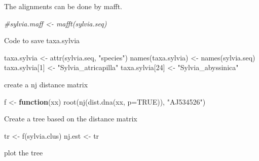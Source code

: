 \documentclass[
]{article}
\newenvironment{Shaded}{\begin{snugshade}}{\end{snugshade}}
\newcommand{\AttributeTok}[1]{\textcolor[rgb]{0.77,0.63,0.00}{#1}}
\newcommand{\CommentTok}[1]{\textcolor[rgb]{0.56,0.35,0.01}{\textit{#1}}}
\newcommand{\ConstantTok}[1]{\textcolor[rgb]{0.00,0.00,0.00}{#1}}
\newcommand{\ControlFlowTok}[1]{\textcolor[rgb]{0.13,0.29,0.53}{\textbf{#1}}}
\newcommand{\DecValTok}[1]{\textcolor[rgb]{0.00,0.00,0.81}{#1}}
\newcommand{\FunctionTok}[1]{\textcolor[rgb]{0.00,0.00,0.00}{#1}}
\newcommand{\NormalTok}[1]{#1}
\newcommand{\OtherTok}[1]{\textcolor[rgb]{0.56,0.35,0.01}{#1}}
\newcommand{\SpecialCharTok}[1]{\textcolor[rgb]{0.00,0.00,0.00}{#1}}
\newcommand{\StringTok}[1]{\textcolor[rgb]{0.31,0.60,0.02}{#1}}
\begin{document}
The alignments can be done by mafft.

\begin{Shaded}
\begin{Highlighting}[]
\CommentTok{\#sylvia.maff \textless{}{-} mafft(sylvia.seq)}
\end{Highlighting}
\end{Shaded}

Code to save taxa.sylvia

\begin{Shaded}
\begin{Highlighting}[]
\NormalTok{taxa.sylvia }\OtherTok{\textless{}{-}} \FunctionTok{attr}\NormalTok{(sylvia.seq, }\StringTok{"species"}\NormalTok{)}
\FunctionTok{names}\NormalTok{(taxa.sylvia) }\OtherTok{\textless{}{-}} \FunctionTok{names}\NormalTok{(sylvia.seq)}
\NormalTok{taxa.sylvia[}\DecValTok{1}\NormalTok{] }\OtherTok{\textless{}{-}} \StringTok{"Sylvia\_atricapilla"}
\NormalTok{taxa.sylvia[}\DecValTok{24}\NormalTok{] }\OtherTok{\textless{}{-}} \StringTok{"Sylvia\_abyssinica"}
\end{Highlighting}
\end{Shaded}

create a nj distance matrix

\begin{Shaded}
\begin{Highlighting}[]
\NormalTok{f }\OtherTok{\textless{}{-}} \ControlFlowTok{function}\NormalTok{(xx) }\FunctionTok{root}\NormalTok{(}\FunctionTok{nj}\NormalTok{(}\FunctionTok{dist.dna}\NormalTok{(xx, }\AttributeTok{p=}\ConstantTok{TRUE}\NormalTok{)), }\StringTok{"AJ534526"}\NormalTok{)}
\end{Highlighting}
\end{Shaded}

Create a tree based on the distance matrix

\begin{Shaded}
\begin{Highlighting}[]
\NormalTok{tr }\OtherTok{\textless{}{-}} \FunctionTok{f}\NormalTok{(sylvia.clus)}
\NormalTok{nj.est }\OtherTok{\textless{}{-}}\NormalTok{ tr}
\end{Highlighting}
\end{Shaded}

plot the tree

\begin{Shaded}
\end{Shaded}
\end{document}
